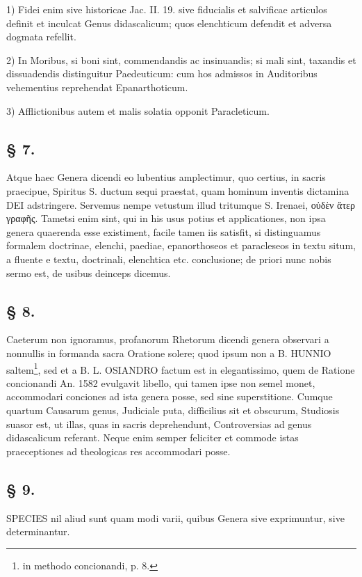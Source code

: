 1) Fidei enim sive historicae Jac. II. 19. sive fiducialis et salvificae articulos definit et inculcat Genus didascalicum; quos elenchticum defendit et adversa dogmata refellit.

2) In Moribus, si boni sint, commendandis ac insinuandis; si mali sint, taxandis et dissuadendis distinguitur Paedeuticum: cum hos admissos in Auditoribus vehementius reprehendat Epanarthoticum.

3) Afflictionibus autem et malis solatia opponit Paracleticum.

\subsection*{§ 7.}

Atque haec Genera dicendi eo lubentius amplectimur, quo certius, in sacris praecipue, Spiritus S. ductum sequi praestat, quam hominum inventis dictamina DEI adstringere. Servemus nempe vetustum illud tritumque S. Irenaei, οὐδὲν ἄτερ γραφῆς. Tametsi enim sint, qui in his usus potius et applicationes, non ipsa genera quaerenda esse existiment, facile tamen iis satisfit, si distinguamus formalem doctrinae, elenchi, paediae, epanorthoseos et paracleseos in textu situm, a fluente e textu, doctrinali, elenchtica etc. conclusione; de priori nunc nobis sermo est, de usibus deinceps dicemus.

\subsection*{§ 8.}

Caeterum non ignoramus, profanorum Rhetorum dicendi genera observari a nonnullis in formanda sacra Oratione solere; quod ipsum non a B. HUNNIO saltem\footnote{in methodo concionandi, p. 8.}, sed et a B. L. OSIANDRO factum est in elegantissimo, quem de Ratione concionandi An. 1582 evulgavit libello, qui tamen ipse non semel monet, accommodari conciones ad ista genera posse, sed sine superstitione. Cumque quartum Causarum genus, Judiciale puta, difficilius sit et obscurum, Studiosis suasor est, ut illas, quas in sacris deprehendunt, Controversias ad genus didascalicum referant. Neque enim semper feliciter et commode istas praeceptiones ad theologicas res accommodari posse.

\subsection*{§ 9.}

SPECIES nil aliud sunt quam modi varii, quibus Genera sive exprimuntur, sive determinantur.


